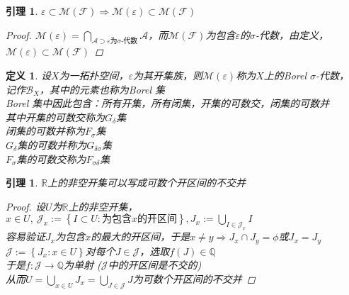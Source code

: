 \documentclass[12pt, a4paper, oneside]{ctexbook}
\newtheorem{definition}[theorem]{定义}
\newtheorem{lemma}[theorem]{引理}
\begin{document}
\begin{lemma}
    $\varepsilon\subset\mathcal{M}(\mathcal{F})\Rightarrow\mathcal{M}(\varepsilon)\subset\mathcal{M}(\mathcal{F})$
    \begin{proof}
        $\mathcal{M}(\varepsilon)=\bigcap_{\mathcal{A}\supset\varepsilon\text{为$\sigma$-代数}}\mathcal{A}$，而$\mathcal{M}(\mathcal{F})$为包含$\varepsilon$的$\sigma$-代数，由定义，\\
        $\mathcal{M}(\varepsilon)\subset\mathcal{M}(\mathcal{F})$
    \end{proof}
\end{lemma}
\begin{definition}
    设$X$为一拓扑空间，$\varepsilon$为其开集族，则$\mathcal{M}(\varepsilon)$称为$X$上的Borel $\sigma$-代数，
    记作$\mathcal{B}_X$，其中的元素也称为Borel 集\\
    Borel 集中因此包含：所有开集，所有闭集，开集的可数交，闭集的可数并\\
    其中开集的可数交称为$G_{\delta}$集\\
    闭集的可数并称为$F_{\sigma}$集\\
    $G_{\delta}$集的可数并称为$G_{\delta\sigma}$集\\
    $F_{\sigma}$集的可数交称为$F_{\sigma\delta}$集
\end{definition}
\begin{lemma}
    $\mathbb{R}$上的非空开集可以写成可数个开区间的不交并
    \begin{proof}
        设$U$为$\mathbb{R}$上的非空开集，\\
        $x\in U,\ \mathcal{J}_x:=\left\{I\subset U:\text{为包含$x$的开区间}\right\},J_x:=\bigcup_{I\in\mathcal{J}_x}I$\\
        容易验证$J_x$为包含$x$的最大的开区间，于是$x\neq y\Rightarrow J_x\cap J_y=\phi$或$J_x=J_y$\\
        $\mathcal{J}:=\left\{J_x:x\in U\right\}$对每个$J\in\mathcal{J}$，选取$f(J)\in\mathbb{Q}$\\
        于是$f:\mathcal{J}\rightarrow\mathbb{Q}$为单射 ($\mathcal{J}$中的开区间是不交的)\\
        从而$U=\bigcup_{x\in U}J_x=\bigcup_{J\in\mathcal{J}}J$为可数个开区间的不交并
    \end{proof}
\end{lemma}
\end{document}
